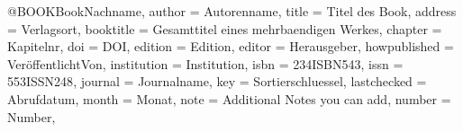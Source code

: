 @BOOK{BookNachname,
    author = {Autorenname},                      %
    title = {Titel des Book},     %
    address = {Verlagsort},                      %
    booktitle = {Gesamttitel eines mehrbaendigen Werkes},                              %
    chapter = {Kapitelnr},                       %
    doi = {DOI},                                 %
    edition = {Edition},                         %
    editor = {Herausgeber},                      %
    howpublished = {VeröffentlichtVon},          %
    institution = {Institution},                 %
    isbn = {234ISBN543},                         %
    issn = {553ISSN248},                         %
    journal = {Journalname},                     %
    key = {Sortierschluessel},                   %
    lastchecked = {Abrufdatum},                  %
    month = {Monat},                             %
    note = {Additional Notes you can add},       %
    number = {Number},                           %
}
